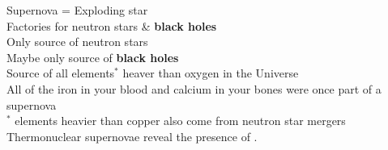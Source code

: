 Supernova = Exploding star\hfill\\[14pt]
Factories for {\color{gray}neutron stars} \& {\color{black}\bf black holes}\\
{\scriptsize Only source of {\color{gray}neutron stars}}\\
{\scriptsize Maybe only source of {\color{black}\bf black holes}}\\[14pt]
Source of all elements${}^*$ heaver than oxygen in the Universe\\
{\scriptsize All of the {\color{red}iron} in your blood and {\color{yellow}calcium} in your bones were once part of a supernova}\\
{\scriptsize ${}^*$ elements heavier than {\color{green}copper} also come from {\color{gray}neutron star} mergers}\\[14pt]
Thermonuclear supernovae reveal the presence of \color{magenta}{dark energy}.\\

